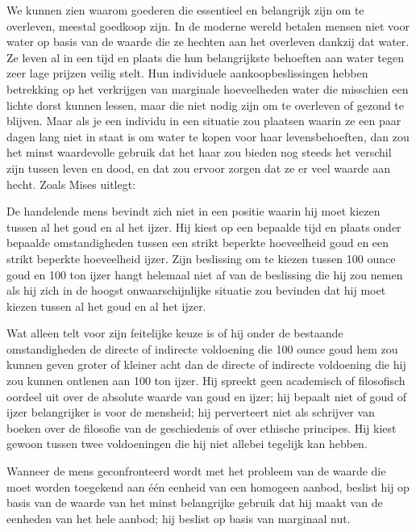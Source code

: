 We kunnen zien waarom goederen die essentieel en belangrijk zijn om te overleven, meestal goedkoop zijn. In de moderne wereld betalen mensen niet voor water op basis van de waarde die ze hechten aan het overleven dankzij dat water. Ze leven al in een tijd en plaats die hun belangrijkste behoeften aan water tegen zeer lage prijzen veilig stelt. Hun individuele aankoopbeslissingen hebben betrekking op het verkrijgen van marginale hoeveelheden water die misschien een lichte dorst kunnen lessen, maar die niet nodig zijn om te overleven of gezond te blijven. Maar als je een individu in een situatie zou plaatsen waarin ze een paar dagen lang niet in staat is om water te kopen voor haar levensbehoeften, dan zou het minst waardevolle gebruik dat het haar zou bieden nog steeds het verschil zijn tussen leven en dood, en dat zou ervoor zorgen dat ze er veel waarde aan hecht. Zoals Mises uitlegt:

\begin{blockquotebox}
    De handelende mens bevindt zich niet in een positie waarin hij moet kiezen tussen al het goud en al het ijzer. Hij kiest op een bepaalde tijd en plaats onder bepaalde omstandigheden tussen een strikt beperkte hoeveelheid goud en een strikt beperkte hoeveelheid ijzer. Zijn beslissing om te kiezen tussen 100 ounce goud en 100 ton ijzer hangt helemaal niet af van de beslissing die hij zou nemen als hij zich in de hoogst onwaarschijnlijke situatie zou bevinden dat hij moet kiezen tussen al het goud en al het ijzer.
    \par\vspace{1em}\noindent
    Wat alleen telt voor zijn feitelijke keuze is of hij onder de bestaande omstandigheden de directe of indirecte voldoening die 100 ounce goud hem zou kunnen geven groter of kleiner acht dan de directe of indirecte voldoening die hij zou kunnen ontlenen aan 100 ton ijzer. Hij spreekt geen academisch of filosofisch oordeel uit over de absolute waarde van goud en ijzer; hij bepaalt niet of goud of ijzer belangrijker is voor de mensheid; hij perverteert niet als schrijver van boeken over de filosofie van de geschiedenis of over ethische principes. Hij kiest gewoon tussen twee voldoeningen die hij niet allebei tegelijk kan hebben.
    \par\vspace{1em}\noindent
    Wanneer de mens geconfronteerd wordt met het probleem van de waarde die moet worden toegekend aan één eenheid van een homogeen aanbod, beslist hij op basis van de waarde van het minst belangrijke gebruik dat hij maakt van de eenheden van het hele aanbod; hij beslist op basis van marginaal nut.\footnotemark
\end{blockquotebox}
\autocite{23}

